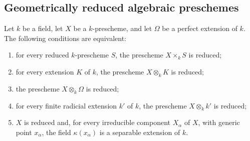 \subsection{Geometrically reduced algebraic preschemes}
\label{subsection:IV.4.6}
\label{IV.4.6}

\begin{proposition}[4.6.1]
\label{IV.4.6.1}
Let $k$ be a field, let $X$ be a $k$-prescheme, and let $\Omega$ be a
perfect extension of $k$.
The following conditions are equivalent:
\begin{enumerate}
\item[\rm(a)]
\label{IV.4.6.1.a}
for every reduced $k$-prescheme $S$, the prescheme $X\times_k S$ is
reduced;

\item[\rm(b)]
\label{IV.4.6.1.b}
for every extension $K$ of $k$, the prescheme $X\otimes_k K$ is
reduced;

\item[\rm(c)]
\label{IV.4.6.1.c}
the prescheme $X\otimes_k\Omega$ is reduced;

\item[\rm(d)]
\label{IV.4.6.1.d}
for every finite radicial extension $k'$ of $k$, the prescheme
$X\otimes_k k'$ is reduced;

\item[\rm(e)]
\label{IV.4.6.1.e}
$X$ is reduced and, for every irreducible component $X_\alpha$ of
$X$, with generic point $x_\alpha$, the field $\kappa(x_\alpha)$ is a
separable extension of $k$.
\end{enumerate}
\end{proposition}

